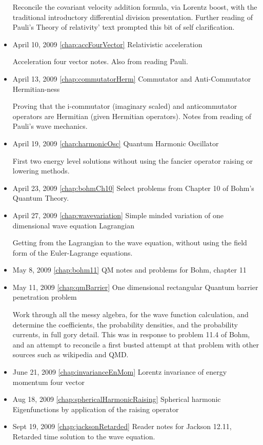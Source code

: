 \begin{itemize}
Reconcile the covariant velocity addition formula, via Lorentz boost, with the traditional introductory differential division presentation.  Further reading of Pauli's Theory of relativity' text prompted this bit of self clarification.\item April 10, 2009 \ref{chap:accFourVector} Relativistic acceleration

Acceleration four vector notes.  Also from reading Pauli.\item April 13, 2009 \ref{chap:commutatorHerm} Commutator and Anti-Commutator Hermitian-ness

Proving that the i-commutator (imaginary scaled) and anticommutator operators are Hermitian (given Hermitian operators).  Notes from reading of Pauli's wave mechanics.\item April 19, 2009 \ref{chap:harmonicOsc} Quantum Harmonic Oscillator

First two energy level solutions without using the fancier operator raising or lowering methods. \item April 23, 2009 \ref{chap:bohmCh10} Select problems from Chapter 10 of Bohm's Quantum Theory.

\item April 27, 2009 \ref{chap:wavevariation} Simple minded variation of one dimensional wave equation Lagrangian

Getting from the Lagrangian to the wave equation, without using the field form of the Euler-Lagrange equations. \item May 8, 2009 \ref{chap:bohm11} QM notes and problems for Bohm, chapter 11

\item May 11, 2009 \ref{chap:qmBarrier} One dimensional rectangular Quantum barrier penetration problem

Work through all the messy algebra, for the wave function calculation, and determine the coefficients, the probability densities, and the probability currents, in full gory detail.  This was in response to problem 11.4 of Bohm, and an attempt to reconcile a first busted attempt at that problem with other sources such as wikipedia and QMD. \item June 21, 2009 \ref{chap:invarianceEnMom} Lorentz invariance of energy momentum four vector

\item Aug 18, 2009 \ref{chap:sphericalHarmonicRaising} Spherical harmonic Eigenfunctions by application of the raising operator

\item Sept 19, 2009 \ref{chap:jacksonRetarded} Reader notes for Jackson 12.11, Retarded time solution to the wave equation.


\end{itemize}
